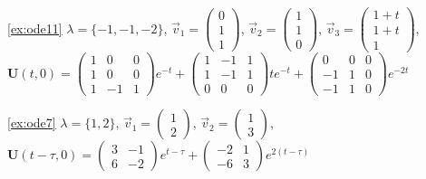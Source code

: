 \documentclass[a4paper,10pt]{book}
\begin{document}
\ref{ex:ode11} $\lambda=\{-1,-1,-2\}$, 
              $\vec{v}_1=\left(\begin{smallmatrix} 0\\ 1 \\ 1 \end{smallmatrix} \right)$, 
              $\vec{v}_2=\left(\begin{smallmatrix} 1\\ 1 \\ 0 \end{smallmatrix} \right)$, 
              $\vec{v}_3=\left(\begin{smallmatrix} 1+t\\ 1+t \\ 1 \end{smallmatrix} \right)$,\\
              \hphantom{\ref{ex:ode1}} $\mathbf{U}(t,0)=\left(\begin{smallmatrix} 1 & 0 & 0\\ 1 & 0 & 0 \\ 1 & -1 & 1 \end{smallmatrix} \right)e^{-t}
               +\left(\begin{smallmatrix} 1 & -1 & 1\\ 1 & -1 & 1 \\ 0 & 0 & 0 \end{smallmatrix} \right)te^{-t}
               +\left(\begin{smallmatrix} 0 & 0 & 0\\ -1 & 1 & 0 \\ -1 & 1 & 0 \end{smallmatrix} \right)e^{-2t}$

\ref{ex:ode7} $\lambda=\{1,2\}$, 
              $\vec{v}_1=\left(\begin{smallmatrix} 1\\ 2 \end{smallmatrix} \right)$, 
              $\vec{v}_2=\left(\begin{smallmatrix} 1\\ 3 \end{smallmatrix} \right)$, \\
              \hphantom{\ref{ex:ode7}} $\mathbf{U}(t-\tau,0)=\left(\begin{smallmatrix} 3 & -1 \\ 6 & -2 \end{smallmatrix} \right)e^{t-\tau}
               +\left(\begin{smallmatrix} -2 & 1 \\ -6 & 3 \end{smallmatrix} \right)e^{2(t-\tau)}$
              
\end{document}
